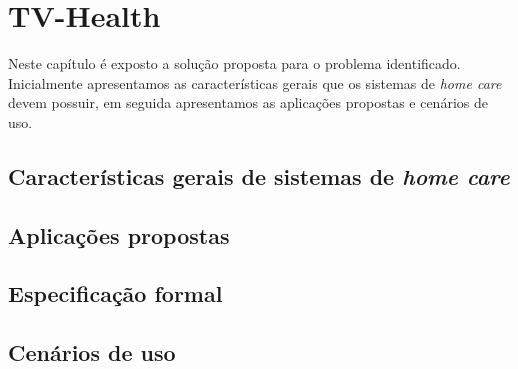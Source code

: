 \chapter{TV-Health}\label{cap:tv-health}

Neste capítulo é exposto a solução proposta para o problema identificado. 
Inicialmente apresentamos as características gerais que os sistemas de 
\textit{home care} devem possuir, em seguida apresentamos as aplicações
propostas e cenários de uso.

\section{Características gerais de sistemas de \textit{home care}}
\label{sec:caracteristicas-gerais-home-care}

\lipsum[1]

\section{Aplicações propostas} \label{sec:aplicacoes-propostas} 

\lipsum[1]

\section{Especificação formal} \label{sec:especificacao-formal}

\lipsum[1]

\section{Cenários de uso} \label{sec:cenarios-de-uso}

\lipsum[1]